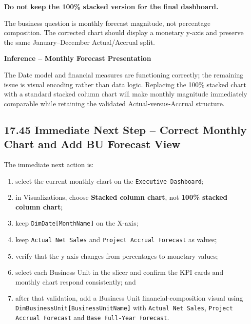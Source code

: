 \documentclass[11pt,a4paper]{article}
\begin{document}
\begin{warningbox}

\textbf{Do not keep the 100\% stacked version for the final dashboard.}

The business question is monthly forecast magnitude, not percentage composition.
The corrected chart should display a monetary y-axis and preserve the same
January--December Actual/Accrual split.

\end{warningbox}

\begin{inferencebox}

\textbf{Inference -- Monthly Forecast Presentation}

The Date model and financial measures are functioning correctly; the remaining
issue is visual encoding rather than data logic. Replacing the 100\% stacked chart
with a standard stacked column chart will make monthly magnitude immediately
comparable while retaining the validated Actual-versus-Accrual structure.

\end{inferencebox}


\subsection{17.45 Immediate Next Step -- Correct Monthly Chart and Add BU Forecast View}

The immediate next action is:

\begin{enumerate}[leftmargin=9mm,itemsep=2pt]
    \item select the current monthly chart on the \texttt{Executive Dashboard};
    \item in Visualizations, choose \textbf{Stacked column chart}, not
    \textbf{100\% stacked column chart};
    \item keep \texttt{DimDate[MonthName]} on the X-axis;
    \item keep \texttt{Actual Net Sales} and
    \texttt{Project Accrual Forecast} as values;
    \item verify that the y-axis changes from percentages to monetary values;
    \item select each Business Unit in the slicer and confirm the KPI cards and
    monthly chart respond consistently; and
    \item after that validation, add a Business Unit financial-composition visual
    using \texttt{DimBusinessUnit[BusinessUnitName]} with
    \texttt{Actual Net Sales}, \texttt{Project Accrual Forecast} and
    \texttt{Base Full-Year Forecast}.
\end{enumerate}
\end{document}
